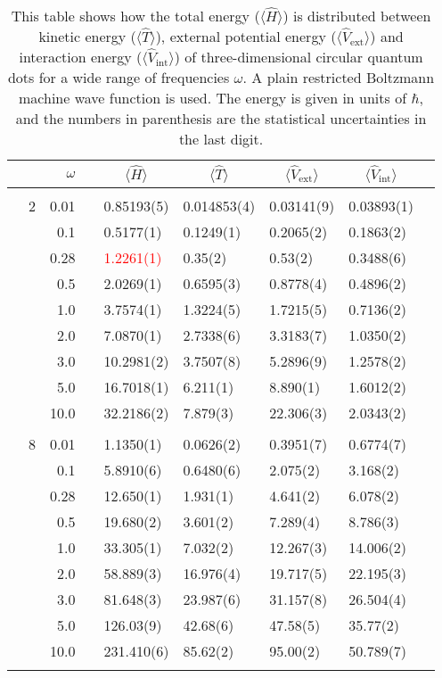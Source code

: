\begin{table}[H]
	\caption{This table shows how the total energy ($\langle\hat{H}\rangle$) is distributed between kinetic energy ($\langle\hat{T}\rangle$), external potential energy ($\langle\hat{V}_{\text{ext}}\rangle$) and interaction energy ($\langle\hat{V}_{\text{int}}\rangle$) of three-dimensional circular quantum dots for a wide range of frequencies $\omega$. A plain restricted Boltzmann machine wave function is used. The energy is given in units of $\hbar$, and the numbers in parenthesis are the statistical uncertainties in the last digit.}
	\label{tab:splitfrequencyQDRBM3D}
	\begin{tabularx}{\textwidth}{R{1cm}rrcR{2.3cm}R{2.3cm}R{2.3cm}R{2.3cm}R{1cm}} \hline\hline
		&\makecell{\\ \phantom{$N$} \\ \phantom{=}} & $\omega$ &&  &  &  &  & \\ \hline \\
		&2 & 0.01 && 0.85193(5) & 0.014853(4) & 0.03141(9) & 0.03893(1) \\
		&& 0.1 && 0.5177(1) & 0.1249(1) & 0.2065(2) & 0.1863(2) \\
		&& 0.28 && \textcolor{red}{1.2261(1)} & 0.35(2) & 0.53(2) & 0.3488(6) \\
		&& 0.5 && 2.0269(1) & 0.6595(3) & 0.8778(4) & 0.4896(2) \\
		&& 1.0 && 3.7574(1) & 1.3224(5) & 1.7215(5) & 0.7136(2) \\
		&& 2.0 && 7.0870(1) & 2.7338(6) & 3.3183(7) & 1.0350(2) \\
		&& 3.0 && 10.2981(2) & 3.7507(8) & 5.2896(9) & 1.2578(2) \\ 
		&& 5.0 && 16.7018(1) & 6.211(1) & 8.890(1) & 1.6012(2) \\
		&& 10.0 && 32.2186(2) & 7.879(3) & 22.306(3) & 2.0343(2) \\
		\hdashline \\
		
		&8 & 0.01 && 1.1350(1) & 0.0626(2) & 0.3951(7) & 0.6774(7) \\
		&& 0.1 && 5.8910(6) & 0.6480(6) & 2.075(2) & 3.168(2) \\
		&& 0.28 && 12.650(1) & 1.931(1) & 4.641(2) & 6.078(2) \\
		&& 0.5 && 19.680(2) & 3.601(2) & 7.289(4) & 8.786(3) \\
		&& 1.0 && 33.305(1) & 7.032(2) & 12.267(3) & 14.006(2) \\
		&& 2.0 && 58.889(3) & 16.976(4) & 19.717(5) & 22.195(3) \\
		&& 3.0 && 81.648(3) & 23.987(6) & 31.157(8) & 26.504(4) \\ 
		&& 5.0 && 126.03(9) & 42.68(6) & 47.58(5) & 35.77(2) \\
		&& 10.0 && 231.410(6) & 85.62(2) & 95.00(2) & 50.789(7) \\
		\hdashline \\
		

\end{tabularx}
\end{table}
